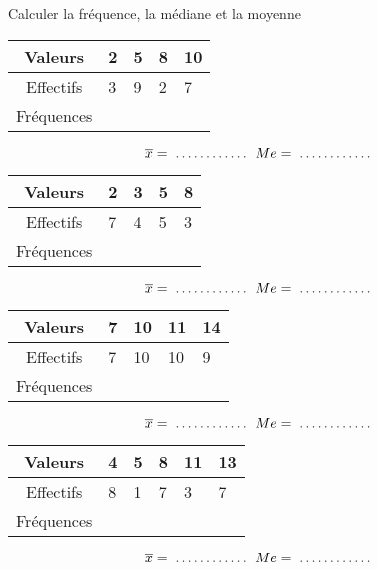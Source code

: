  Calculer la fréquence, la médiane et la moyenne

\begin{multicols}{2}

\begin{center}
\begin{tabular}{c*{4}{|p{0.5cm}}}
 Valeurs  & 2 & 5 & 8 & 10\\ \hline 
 Effectifs  & 3 & 9 & 2 & 7\\ \hline 
 Fréquences &  &  &  & \\[0.5cm]
\end{tabular}
\end{center}$$\overline{x}=\filling ~ Me=\filling$$


\begin{center}
\begin{tabular}{c*{4}{|p{0.5cm}}}
 Valeurs  & 2 & 3 & 5 & 8\\ \hline 
 Effectifs  & 7 & 4 & 5 & 3\\ \hline 
 Fréquences &  &  &  & \\[0.5cm]
\end{tabular}
\end{center}$$\overline{x}=\filling ~ Me=\filling$$


\begin{center}
\begin{tabular}{c*{4}{|p{0.5cm}}}
 Valeurs  & 7 & 10 & 11 & 14\\ \hline 
 Effectifs  & 7 & 10 & 10 & 9\\ \hline 
 Fréquences &  &  &  & \\[0.5cm]
\end{tabular}
\end{center}$$\overline{x}=\filling ~ Me=\filling$$


\begin{center}
\begin{tabular}{c*{5}{|p{0.5cm}}}
 Valeurs  & 4 & 5 & 8 & 11 & 13\\ \hline 
 Effectifs  & 8 & 1 & 7 & 3 & 7\\ \hline 
 Fréquences &  &  &  &  & \\[0.5cm]
\end{tabular}
\end{center}$$\overline{x}=\filling ~ Me=\filling$$


\end{multicols}
